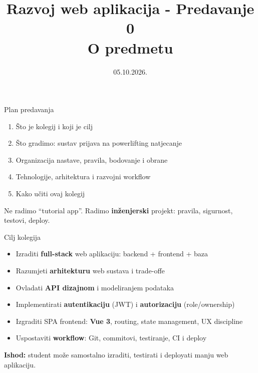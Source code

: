 

\title[Razvoj web aplikacija]{Razvoj web aplikacija - Predavanje 0 \\ O predmetu}
\date{05.10.2026.}



\frame{\titlepage}

\begin{frame}{Plan predavanja}
\begin{enumerate}
  \item Što je kolegij i koji je cilj
  \item Što gradimo: sustav prijava na powerlifting natjecanje
  \item Organizacija nastave, pravila, bodovanje i obrane
  \item Tehnologije, arhitektura i razvojni workflow
  \item Kako učiti ovaj kolegij
\end{enumerate}

\vspace{0.6em}
Ne radimo \enquote{tutorial app}. Radimo \textbf{inženjerski} projekt: pravila, sigurnost, testovi, deploy.
\end{frame}

\begin{frame}{Cilj kolegija}
\begin{itemize}
  \item Izraditi \textbf{full-stack} web aplikaciju: backend + frontend + baza
  \item Razumjeti \textbf{arhitekturu} web sustava i trade-offe
  \item Ovladati \textbf{API dizajnom} i modeliranjem podataka
  \item Implementirati \textbf{autentikaciju} (JWT) i \textbf{autorizaciju} (role/ownership)
  \item Izgraditi SPA frontend: \textbf{Vue 3}, routing, state management, UX discipline
  \item Uspostaviti \textbf{workflow}: Git, commitovi, testiranje, CI i deploy
\end{itemize}

\vspace{0.4em}
\textbf{Ishod:} student može samostalno izraditi, testirati i deployati manju web aplikaciju.
\end{frame}

